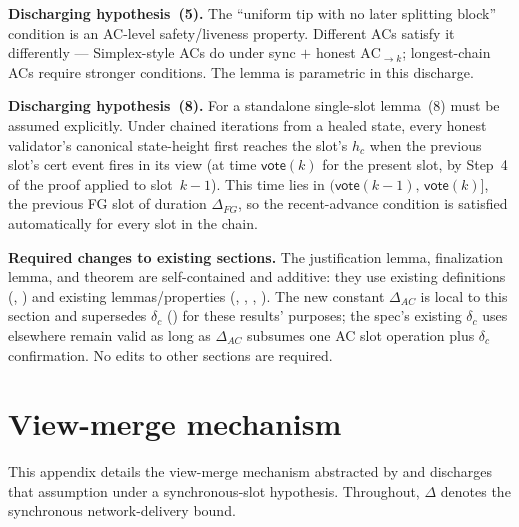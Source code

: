 \documentclass{article}
\newcommand{\vote}{\mathsf{vote}}
\renewcommand{\paragraph}[1]{\vspace{7pt}\noindent\textbf{#1}}
\theoremstyle{plain}
\theoremstyle{definition}
\theoremstyle{remark}
\begin{document}
\paragraph{Discharging hypothesis~(5).} The ``uniform tip with no later splitting block'' condition is an AC-level safety/liveness property. Different ACs satisfy it differently --- Simplex-style ACs do under sync $+$ honest $\mathrm{AC}_{\to k}$; longest-chain ACs require stronger conditions. The lemma is parametric in this discharge.

\paragraph{Discharging hypothesis~(8).} For a standalone single-slot lemma~(8) must be assumed explicitly. Under chained iterations from a healed state, every honest validator's canonical state-height first reaches the slot's $h_c$ when the previous slot's cert event fires in its view (at time $\vote(k)$ for the present slot, by Step~4 of the proof applied to slot~$k-1$). This time lies in $(\vote(k-1),\, \vote(k)]$, the previous FG slot of duration $\Delta_{FG}$, so the recent-advance condition is satisfied automatically for every slot in the chain.

\paragraph{Required changes to existing sections.} The justification lemma, finalization lemma, and theorem are self-contained and additive: they use existing definitions (, ) and existing lemmas/properties (, , , ). The new constant $\Delta_{AC}$ is local to this section and supersedes $\delta_c$ () for these results' purposes; the spec's existing $\delta_c$ uses elsewhere remain valid as long as $\Delta_{AC}$ subsumes one AC slot operation plus $\delta_c$ confirmation. No edits to other sections are required.

\appendix

\section{View-merge mechanism}\label{app:view-merge}

This appendix details the view-merge mechanism abstracted by  and discharges that assumption under a synchronous-slot hypothesis.
Throughout, $\Delta$ denotes the synchronous network-delivery bound.
\end{document}
